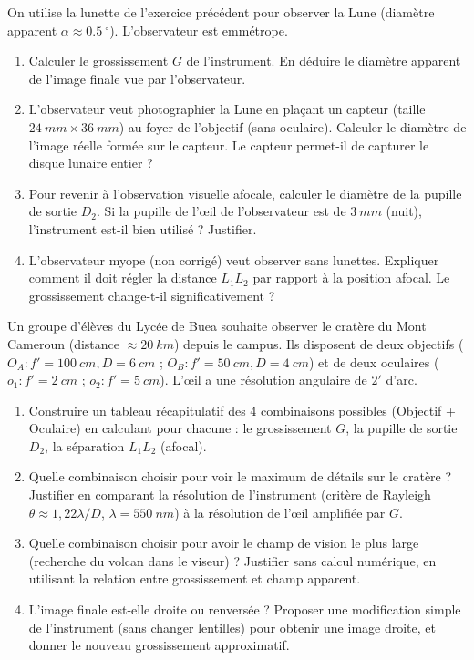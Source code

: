 \documentclass[11pt]{article}
\providecommand{\degree}{^{\circ}}
\begin{document}
\begin{exercice}
On utilise la lunette de l'exercice précédent pour observer la Lune (diamètre apparent $\alpha \approx \SI{0,5}{\degree}$). L'observateur est emmétrope.
\begin{enumerate}
    \item Calculer le grossissement $G$ de l'instrument. En déduire le diamètre apparent de l'image finale vue par l'observateur.
    \item L'observateur veut photographier la Lune en plaçant un capteur (taille $\SI{24}{mm} \times \SI{36}{mm}$) au foyer de l'objectif (sans oculaire). Calculer le diamètre de l'image réelle formée sur le capteur. Le capteur permet-il de capturer le disque lunaire entier ?
    \item Pour revenir à l'observation visuelle afocale, calculer le diamètre de la pupille de sortie $D_2$. Si la pupille de l'œil de l'observateur est de $\SI{3}{mm}$ (nuit), l'instrument est-il bien utilisé ? Justifier.
    \item L'observateur myope (non corrigé) veut observer sans lunettes. Expliquer comment il doit régler la distance $L_1L_2$ par rapport à la position afocal. Le grossissement change-t-il significativement ?
\end{enumerate}
\end{exercice}

\begin{exercice}
Un groupe d'élèves du Lycée de Buea souhaite observer le cratère du Mont Cameroun (distance $\approx \SI{20}{km}$) depuis le campus. Ils disposent de deux objectifs ($O_A : f'=\SI{100}{cm}, D=\SI{6}{cm}$ ; $O_B : f'=\SI{50}{cm}, D=\SI{4}{cm}$) et de deux oculaires ($o_1 : f'=\SI{2}{cm}$ ; $o_2 : f'=\SI{5}{cm}$). L'œil a une résolution angulaire de $2'$ d'arc.
\begin{enumerate}
    \item Construire un tableau récapitulatif des 4 combinaisons possibles (Objectif + Oculaire) en calculant pour chacune : le grossissement $G$, la pupille de sortie $D_2$, la séparation $L_1L_2$ (afocal).
    \item Quelle combinaison choisir pour voir le maximum de détails sur le cratère ? Justifier en comparant la résolution de l'instrument (critère de Rayleigh $\theta \approx 1,22 \lambda/D$, $\lambda = \SI{550}{nm}$) à la résolution de l'œil amplifiée par $G$.
    \item Quelle combinaison choisir pour avoir le champ de vision le plus large (recherche du volcan dans le viseur) ? Justifier sans calcul numérique, en utilisant la relation entre grossissement et champ apparent.
    \item L'image finale est-elle droite ou renversée ? Proposer une modification simple de l'instrument (sans changer lentilles) pour obtenir une image droite, et donner le nouveau grossissement approximatif.
\end{enumerate}
\end{exercice}
\end{document}
